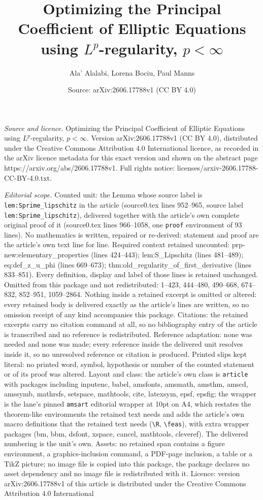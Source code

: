 \documentclass[10pt,a4paper]{amsart}
\title[Optimizing the Principal Coefficient of Elliptic Equations u]{Optimizing the Principal Coefficient of Elliptic Equations using $L^p$-regularity, $p < \infty$}
\author{Ala' Alalabi, Lorena Bociu, Paul Manns}
\date{Source: arXiv:2606.17788v1 (CC BY 4.0)}
\begin{document}
\maketitle

\noindent\emph{Source and licence.} Optimizing the Principal Coefficient of Elliptic Equations using $L^p$-regularity, $p < \infty$. Version arXiv:2606.17788v1 (CC BY 4.0), distributed under the Creative Commons Attribution 4.0 International licence, as recorded in the arXiv licence metadata for this exact version and shown on the abstract page https://arxiv.org/abs/2606.17788v1. Full rights notice: licenses/arxiv-2606.17788-CC-BY-4.0.txt.\par\smallskip

\noindent\textit{Editorial scope.} Counted unit: the Lemma whose source label is \texttt{lem:Sprime\_lipschitz} in the article (source0.tex lines 952--965, source label \texttt{lem:Sprime\_lipschitz}), delivered together with the article's own complete original proof of it (source0.tex lines 966--1058, one \texttt{proof} environment of 93 lines). No mathematics is written, repaired or re-derived: statement and proof are the article's own text line for line. Required context retained uncounted: prp-new:elementary\_properties (lines 424--443); lem:S\_Lipschitz (lines 481--489); eq:def\_z\_u\_phi (lines 669--673); thm:old\_regularity\_of\_first\_derivative (lines 833--851). Every definition, display and label of those lines is retained unchanged. Omitted from this package and not redistributed: 1--423, 444--480, 490--668, 674--832, 852--951, 1059--2864. Nothing inside a retained excerpt is omitted or altered: every retained body is delivered exactly as the article's lines are written, so no omission receipt of any kind accompanies this package. Citations: the retained excerpts carry no citation command at all, so no bibliography entry of the article is transcribed and no reference is redistributed. Reference adaptation: none was needed and none was made; every reference inside the delivered unit resolves inside it, so no unresolved reference or citation is produced. Printed slips kept literal: no printed word, symbol, hypothesis or number of the counted statement or of its proof was altered. Layout and class: the article's own class is \texttt{article} with packages including inputenc, babel, amsfonts, amsmath, amsthm, amscd, amssymb, mathrsfs, setspace, mathtools, cite, latexsym, epsf, epsfig; the wrapper is the lane's pinned \texttt{amsart} editorial wrapper at 10pt on A4, which restates the theorem-like environments the retained text needs and adds the article's own macro definitions that the retained text needs (\texttt{\textbackslash R}, \texttt{\textbackslash feas}), with extra wrapper packages (bm, bbm, dsfont, xspace, cancel, mathtools, cleveref). The delivered numbering is the unit's own. Assets: no retained span contains a figure environment, a graphics-inclusion command, a PDF-page inclusion, a table or a TikZ picture; no image file is copied into this package, the package declares no asset dependency and no image file is redistributed with it. Licence: version arXiv:2606.17788v1 of this article is distributed under the Creative Commons Attribution 4.0 International 
\end{document}
